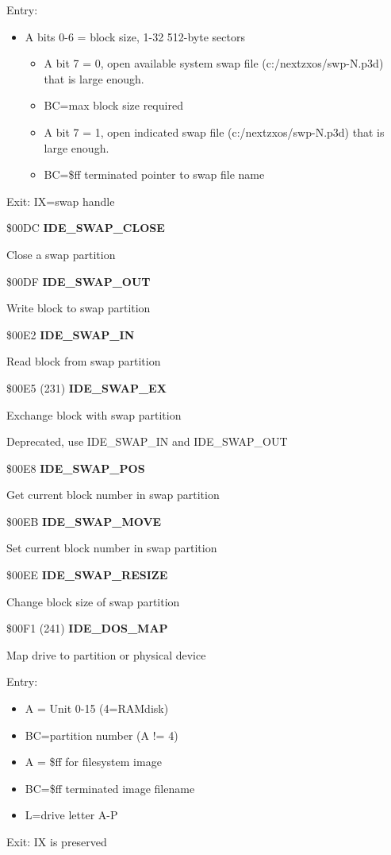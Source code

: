 Entry:
\begin{itemize}
\item[] A bits 0-6 = block size, 1-32 512-byte sectors
  \begin{itemize}
  \item[] A bit 7 = 0, open available system swap file
    (c:/nextzxos/swp-N.p3d) that is large enough.
  \item[] BC=max block size required
  \end{itemize}
  \begin{itemize}
  \item[] A bit 7 = 1, open indicated swap file
    (c:/nextzxos/swp-N.p3d) that is large enough.
  \item[] BC=\$ff terminated pointer to swap file name
  \end{itemize}
\end{itemize}
Exit: IX=swap handle

\$00DC \textbf{IDE\_SWAP\_CLOSE}

Close a swap partition

\$00DF \textbf{IDE\_SWAP\_OUT}

Write block to swap partition

\$00E2 \textbf{IDE\_SWAP\_IN}

Read block from swap partition

\$00E5 (231) \textbf{IDE\_SWAP\_EX}

Exchange block with swap partition

Deprecated, use IDE\_SWAP\_IN and IDE\_SWAP\_OUT

\$00E8 \textbf{IDE\_SWAP\_POS}

Get current block number in swap partition

\$00EB \textbf{IDE\_SWAP\_MOVE}

Set current block number in swap partition

\$00EE \textbf{IDE\_SWAP\_RESIZE}

Change block size of swap partition

\$00F1 (241) \textbf{IDE\_DOS\_MAP}

Map drive to partition or physical device

Entry:
\begin{itemize}
\item[] A = Unit 0-15 (4=RAMdisk)
\item[] BC=partition number (A != 4)
\item[] A = \$ff for filesystem image
\item[] BC=\$ff terminated image filename
\item[] L=drive letter A-P
\end{itemize}
Exit: IX is preserved


